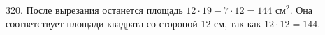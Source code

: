 320. После вырезания останется площадь $12\cdot19-7\cdot12=144\text{ см}^2.$ Она соответствует площади квадрата со стороной 12 см, так как $12\cdot 12=144.$\\
